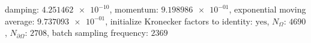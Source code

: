 damping: $\num[scientific-notation=true]{4.251462e-10}$, momentum: $\num[scientific-notation=true]{9.198986e-01}$, exponential moving average: $\num[scientific-notation=true]{9.737093e-01}$, initialize Kronecker factors to identity: $\text{yes}$, $N_{\Omega}$: $\num[scientific-notation=false]{4690}$, $N_{\partial\Omega}$: $\num[scientific-notation=false]{2708}$, batch sampling frequency: $\num[scientific-notation=false]{2369}$